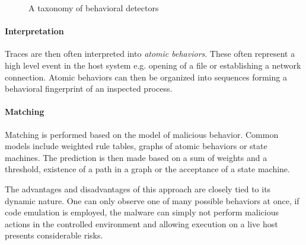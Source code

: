 \begin{figure}[H]
    \centering
    \caption{A taxonomy of behavioral detectors}
    \label{fig_behav_det_tax}
\end{figure}

\paragraph*{Interpretation} Traces are then often interpreted into \emph{atomic behaviors}. These often represent a high level event in the host system e.g. opening of a file or establishing a network connection. Atomic behaviors can then be organized into sequences forming a behavioral fingerprint of an inspected process.

\paragraph*{Matching} Matching is performed based on the model of malicious behavior. Common models include weighted rule tables, graphs of atomic behaviors or state machines. The prediction is then made based on a sum of weights and a threshold, existence of a path in a graph or the acceptance of a state machine.

The advantages and disadvantages of this approach are closely tied to its dynamic nature. One can only observe one of many possible behaviors at once, if code emulation is employed, the malware can simply not perform malicious actions in the controlled environment and allowing execution on a live host presents considerable risks.

